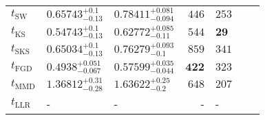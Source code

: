 \begin{tabular}{l|llr|llr}
	\midrule
	$t_{\mathrm{SW}}$ & $0.65743_{-0.13}^{+0.1}$ & $0.78411_{-0.094}^{+0.081}$ & $446$ & $253$ \\
	$t_{\overline{\mathrm{KS}}}$ & $0.54743_{-0.13}^{+0.1}$ & $0.62772_{-0.11}^{+0.085}$ & $544$ & ${\mathbf{29}}$ \\
	$t_{\mathrm{SKS}}$ & $0.65034_{-0.13}^{+0.1}$ & $0.76279_{-0.1}^{+0.093}$ & $859$ & $341$ \\
	$t_{\mathrm{FGD}}$ & ${\mathbf{0.4938_{-0.067}^{+0.051}}}$ & ${\mathbf{0.57599_{-0.044}^{+0.035}}}$ & ${\mathbf{422}}$ & $323$ \\
	$t_{\mathrm{MMD}}$ & $1.36812_{-0.28}^{+0.31}$ & $1.63622_{-0.2}^{+0.25}$ & $648$ & $207$ \\
	$t_{\mathrm{LLR}}$ & - & - & - & - \\
	\bottomrule
\end{tabular}